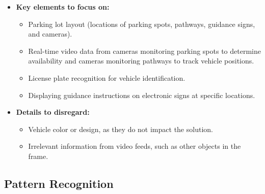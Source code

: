 \documentclass{article}
\begin{document}
\begin{itemize}[label=-]
\begin{itemize}[label=-]
    \item \textbf{Key elements to focus on:}
    \begin{itemize}
        \item Parking lot layout (locations of parking spots, pathways, guidance signs, and cameras).
        \item Real-time video data from cameras monitoring parking spots to determine availability and cameras monitoring pathways to track vehicle positions.
        \item License plate recognition for vehicle identification.
        \item Displaying guidance instructions on electronic signs at specific locations.
    \end{itemize}

    \item \textbf{Details to disregard:}
    \begin{itemize}
        \item Vehicle color or design, as they do not impact the solution.
        \item Irrelevant information from video feeds, such as other objects in the frame.
    \end{itemize}
\end{itemize}

\subsection{Pattern Recognition}


\end{itemize}
\end{document}
